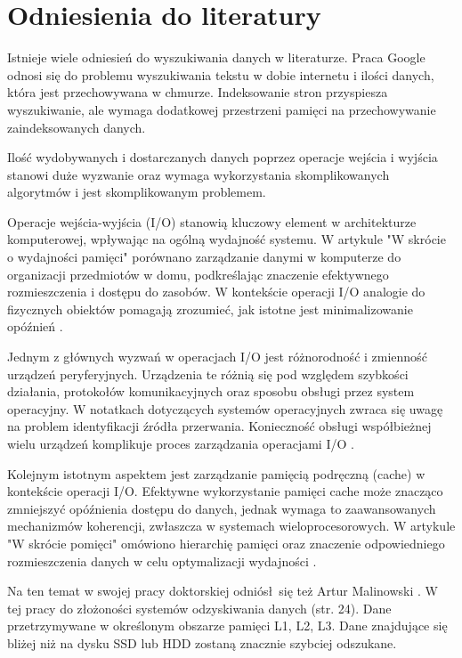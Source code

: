 \section{Odniesienia do literatury}

Istnieje wiele odniesień do wyszukiwania danych w literaturze. Praca Google 
\cite{bib:internet:htmlSearchGoogle} odnosi się do problemu wyszukiwania tekstu 
w dobie internetu i ilości danych, która jest przechowywana w chmurze. 
Indeksowanie stron przyspiesza wyszukiwanie, ale wymaga dodatkowej przestrzeni
pamięci na przechowywanie zaindeksowanych danych.

Ilość wydobywanych i dostarczanych danych poprzez operacje wejścia i wyjścia stanowi duże wyzwanie
oraz wymaga wykorzystania skomplikowanych algorytmów i jest skomplikowanym
problemem. 

Operacje wejścia-wyjścia (I/O) stanowią kluczowy element w architekturze 
komputerowej, wpływając na ogólną wydajność systemu. W artykule "W skrócie o 
wydajności pamięci" porównano zarządzanie danymi w komputerze do 
organizacji przedmiotów w domu, podkreślając znaczenie efektywnego 
rozmieszczenia i dostępu do zasobów. W kontekście operacji I/O analogie do 
fizycznych obiektów pomagają zrozumieć, jak istotne jest minimalizowanie 
opóźnień \cite{bib:internet:IntelMemoryPerformance}. 

Jednym z głównych wyzwań w operacjach I/O jest różnorodność i zmienność 
urządzeń peryferyjnych. Urządzenia te różnią się pod względem szybkości 
działania, protokołów komunikacyjnych oraz sposobu obsługi przez system 
operacyjny. W notatkach dotyczących systemów operacyjnych zwraca się uwagę na 
problem identyfikacji źródła przerwania. Konieczność obsługi współbieżnej 
wielu urządzeń komplikuje proces zarządzania operacjami I/O \cite{bib:wykład:UrzadzeniaWejsciaWyjsci}. 

Kolejnym istotnym aspektem jest zarządzanie pamięcią podręczną (cache) w 
kontekście operacji I/O. Efektywne wykorzystanie pamięci cache może znacząco 
zmniejszyć opóźnienia dostępu do danych, jednak wymaga to zaawansowanych 
mechanizmów koherencji, zwłaszcza w systemach wieloprocesorowych. W artykule 
"W skrócie pomięci" omówiono hierarchię pamięci oraz znaczenie 
odpowiedniego rozmieszczenia danych w celu optymalizacji wydajności \cite{bib:internet:IntelMemoryPerformance}.

Na ten temat w swojej pracy doktorskiej odniósł się też Artur Malinowski \cite{bib:internet:ArturMalinowskiIO}.
W tej pracy do złożoności systemów odzyskiwania danych (str. 24). Dane 
przetrzymywane w określonym obszarze pamięci L1, L2, L3. Dane znajdujące się
bliżej niż na dysku SSD lub HDD zostaną znacznie szybciej odszukane. 

